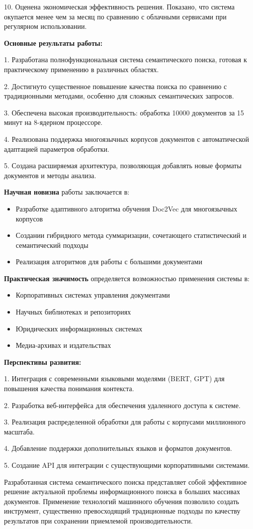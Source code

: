 	10. Оценена экономическая эффективность решения. Показано, что система окупается менее чем за месяц по сравнению с облачными сервисами при регулярном использовании.
	
	\textbf{Основные результаты работы:}
	
	1. Разработана полнофункциональная система семантического поиска, готовая к практическому применению в различных областях.
	
	2. Достигнуто существенное повышение качества поиска по сравнению с традиционными методами, особенно для сложных семантических запросов.
	
	3. Обеспечена высокая производительность: обработка 10000 документов за 15 минут на 8-ядерном процессоре.
	
	4. Реализована поддержка многоязычных корпусов документов с автоматической адаптацией параметров обработки.
	
	5. Создана расширяемая архитектура, позволяющая добавлять новые форматы документов и методы анализа.
	
	\textbf{Научная новизна} работы заключается в:
	\begin{itemize}
		\item Разработке адаптивного алгоритма обучения Doc2Vec для многоязычных корпусов
		\item Создании гибридного метода суммаризации, сочетающего статистический и семантический подходы
		\item Реализация алгоритмов для работы с большими документами
	\end{itemize}
	
	\textbf{Практическая значимость} определяется возможностью применения системы в:
	\begin{itemize}
		\item Корпоративных системах управления документами
		\item Научных библиотеках и репозиториях
		\item Юридических информационных системах
		\item Медиа-архивах и издательствах
	\end{itemize}
	
	\textbf{Перспективы развития:}
	
	1. Интеграция с современными языковыми моделями (BERT, GPT) для повышения качества понимания контекста.
	
	2. Разработка веб-интерфейса для обеспечения удаленного доступа к системе.
	
	3. Реализация распределенной обработки для работы с корпусами миллионного масштаба.
	
	4. Добавление поддержки дополнительных языков и форматов документов.
	
	5. Создание API для интеграции с существующими корпоративными системами.
	
	Разработанная система семантического поиска представляет собой эффективное решение актуальной проблемы информационного поиска в больших массивах документов. Применение технологий машинного обучения позволило создать инструмент, существенно превосходящий традиционные подходы по качеству результатов при сохранении приемлемой производительности.
	